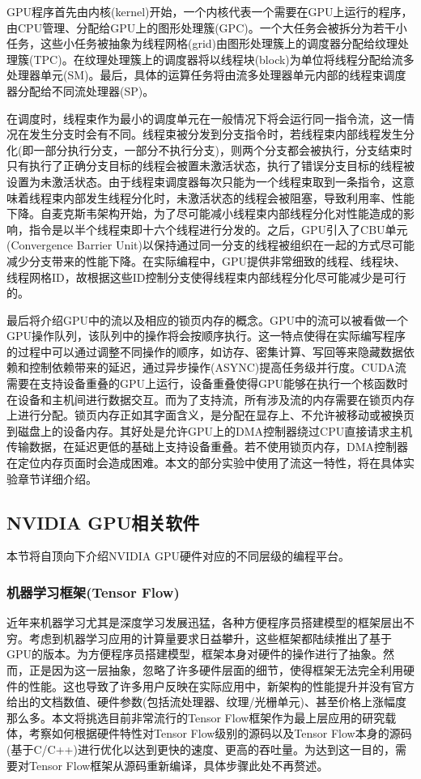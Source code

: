 \par GPU程序首先由内核(kernel)开始，一个内核代表一个需要在GPU上运行的程序，由CPU管理、分配给GPU上的图形处理簇(GPC)。一个大任务会被拆分为若干小任务，这些小任务被抽象为线程网格(grid)由图形处理簇上的调度器分配给纹理处理簇(TPC)。在纹理处理簇上的调度器将以线程块(block)为单位将线程分配给流多处理器单元(SM)。最后，具体的运算任务将由流多处理器单元内部的线程束调度器分配给不同流处理器(SP)。
\par 在调度时，线程束作为最小的调度单元在一般情况下将会运行同一指令流，这一情况在发生分支时会有不同。线程束被分发到分支指令时，若线程束内部线程发生分化(即一部分执行分支，一部分不执行分支)，则两个分支都会被执行，分支结束时只有执行了正确分支目标的线程会被置未激活状态，执行了错误分支目标的线程被设置为未激活状态。由于线程束调度器每次只能为一个线程束取到一条指令，这意味着线程束内部发生线程分化时，未激活状态的线程会被阻塞，导致利用率、性能下降。自麦克斯韦架构开始，为了尽可能减小线程束内部线程分化对性能造成的影响，指令是以半个线程束即十六个线程进行分发的。之后，GPU引入了CBU单元(Convergence Barrier Unit)以保持通过同一分支的线程被组织在一起的方式尽可能减少分支带来的性能下降\cite{THREADS}。在实际编程中，GPU提供非常细致的线程、线程块、线程网格ID，故根据这些ID控制分支使得线程束内部线程分化尽可能减少是可行的\cite{DIVER}。
\par 最后将介绍GPU中的流以及相应的锁页内存的概念。GPU中的流可以被看做一个GPU操作队列，该队列中的操作将会按顺序执行。这一特点使得在实际编写程序的过程中可以通过调整不同操作的顺序，如访存、密集计算、写回等来隐藏数据依赖和控制依赖带来的延迟\cite{STREAM}，通过异步操作(ASYNC)提高任务级并行度。CUDA流需要在支持设备重叠的GPU上运行，设备重叠使得GPU能够在执行一个核函数时在设备和主机间进行数据交互。而为了支持流，所有涉及流的内存需要在锁页内存上进行分配。锁页内存正如其字面含义，是分配在显存上、不允许被移动或被换页到磁盘上的设备内存。其好处是允许GPU上的DMA控制器绕过CPU直接请求主机传输数据，在延迟更低的基础上支持设备重叠\cite{PAGELOCK}。若不使用锁页内存，DMA控制器在定位内存页面时会造成困难。本文的部分实验中使用了流这一特性，将在具体实验章节详细介绍。

\subsection{NVIDIA GPU相关软件}
\par 本节将自顶向下介绍NVIDIA GPU硬件对应的不同层级的编程平台。
\subsubsection{机器学习框架(Tensor Flow)}
\par 近年来机器学习尤其是深度学习发展迅猛，各种方便程序员搭建模型的框架层出不穷。考虑到机器学习应用的计算量要求日益攀升，这些框架都陆续推出了基于GPU的版本。为方便程序员搭建模型，框架本身对硬件的操作进行了抽象。然而，正是因为这一层抽象，忽略了许多硬件层面的细节，使得框架无法完全利用硬件的性能。这也导致了许多用户反映在实际应用中，新架构的性能提升并没有官方给出的文档数值、硬件参数(包括流处理器、纹理/光栅单元)、甚至价格上涨幅度那么多。本文将挑选目前非常流行的Tensor Flow框架作为最上层应用的研究载体，考察如何根据硬件特性对Tensor Flow级别的源码以及Tensor Flow本身的源码(基于C/C++)进行优化以达到更快的速度、更高的吞吐量。为达到这一目的，需要对Tensor Flow框架从源码重新编译，具体步骤此处不再赘述\cite{TFBUILD}。
